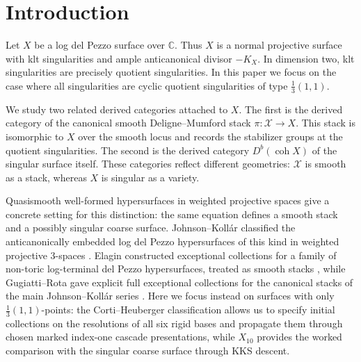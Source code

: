 \documentclass[11pt]{article}
\theoremstyle{plain}
\theoremstyle{definition}
\theoremstyle{remark}
\newcommand{\C}{\mathbb C}
\newcommand{\Db}{D^b}
\newcommand{\coh}{\operatorname{coh}}
\newcommand{\XX}{\mathcal X}
\begin{document}
\section{Introduction}

Let \(X\) be a log del Pezzo surface over \(\C\). Thus \(X\) is a normal projective surface with klt singularities and ample anticanonical divisor \(-K_X\). In dimension two, klt singularities are precisely quotient singularities. In this paper we focus on the case where all singularities are cyclic quotient singularities of type \(\frac13(1,1)\).

We study two related derived categories attached to \(X\). The first is the derived category of the canonical smooth Deligne--Mumford stack \(\pi:\XX\to X\). This stack is isomorphic to \(X\) over the smooth locus and records the stabilizer groups at the quotient singularities. The second is the derived category \(\Db(\coh X)\) of the singular surface itself. These categories reflect different geometries: \(\XX\) is smooth as a stack, whereas \(X\) is singular as a variety.

Quasismooth well-formed hypersurfaces in weighted projective spaces give
a concrete setting for this distinction: the same equation defines a
smooth stack and a possibly singular coarse surface. Johnson--Kollár
classified the anticanonically embedded log del Pezzo hypersurfaces of
this kind in weighted projective \(3\)-spaces \cite{JohnsonKollar2001}.
Elagin constructed exceptional collections for a family of non-toric
log-terminal del Pezzo hypersurfaces, treated as smooth stacks
\cite{Elagin2007}, while Gugiatti--Rota gave explicit full exceptional
collections for the canonical stacks of the main Johnson--Kollár series
\cite{GugiattiRota2023}. Here we focus instead on surfaces with only
\(\frac13(1,1)\)-points: the Corti--Heuberger classification allows us
to specify initial collections on the resolutions of all six rigid bases and
propagate them through chosen marked index-one cascade presentations,
while \(X_{10}\) provides the worked comparison with the singular coarse
surface through KKS descent.
\end{document}
